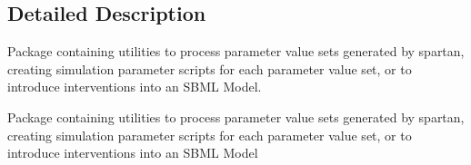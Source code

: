 \subsection{Detailed Description}
Package containing utilities to process parameter value sets generated by spartan, creating simulation parameter scripts for each parameter value set, or to introduce interventions into an S\+B\+M\+L Model. 

Package containing utilities to process parameter value sets generated by spartan, creating simulation parameter scripts for each parameter value set, or to introduce interventions into an S\+B\+M\+L Model 